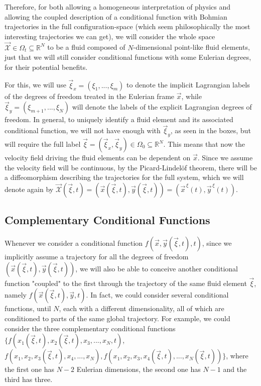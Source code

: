 \documentclass[11pt, a4paper]{article} %
\newcommand{\R}{\mathbb{R}} %
\newcommand{\x}{\mathcal{X}}
\begin{document}
Therefore, for both allowing a homogeneous interpretation of physics and allowing the coupled description of a conditional function with Bohmian trajectories in the full configuration-space (which seem philosophically the most interesting trajectories we can get), we will consider the whole space $\vec{\x}\in\Omega_t\subseteq\R^N$ to be a fluid composed of $N$-dimensional point-like fluid elements, just that we will still consider conditional functions with some Eulerian degrees, for their potential benefits.

For this, we will use $\vec{\xi}_x=(\xi_1,...,\xi_m)$ to denote the implicit Lagrangian labels of the degrees of freedom treated in the Eulerian frame $\vec{x}$, while $\vec{\xi}_y=(\xi_{m+1},...,\xi_N)$ will denote the labels of the explicit Lagrangian degrees of freedom. In general, to uniquely identify a fluid element and its associated conditional function, we will not have enough with $\vec{\xi}_y$, as seen in the boxes, but will require the full label $\vec{\xi}=(\vec{\xi}_x,\vec{\xi}_y)\in \Omega_0\subseteq\R^N$. This means that now the velocity field driving the fluid elements can be dependent on $\vec{x}$. Since we assume the velocity field will be continuous, by the Picard-Lindelöf theorem, there will be a diffeomorphism describing the trajectories for the full system, which we will denote again by $\vec{\x}(\vec{\xi},t)=(\vec{x}(\vec{\xi},t), \vec{y}(\vec{\xi},t))=(\vec{x}^{\, \xi}(t),\vec{y}^{\, \xi}(t))$. 

\subsection*{Complementary Conditional Functions}

Whenever we consider a conditional function $f(\vec{x},\vec{y}(\vec{\xi},t),t)$, since we implicitly assume a trajectory for all the degrees of freedom $(\vec{x}(\vec{\xi},t), \vec{y}(\vec{\xi},t))$, we will also be able to conceive another conditional function "coupled" to the first through the trajectory of the same fluid element $\vec{\xi}$, namely $f(\vec{x}(\vec{\xi},t),\vec{y},t)$. In fact, we could consider several conditional functions, until $N$, each with a different dimensionality, all of which are conditioned to parts of the same global trajectory. For example, we could consider the three complementary conditional functions $\{f(x_1(\vec{\xi},t),x_2(\vec{\xi},t),x_3,...,x_N,t)$, $f(x_1, x_2, x_3(\vec{\xi},t), x_4,...,x_N), f(x_1, x_2, x_3, x_4(\vec{\xi},t),...,x_N(\vec{\xi},t))\}$, where the first one has $N-2$ Eulerian dimensions, the second one has $N-1$ and the third has three. 
\end{document}
